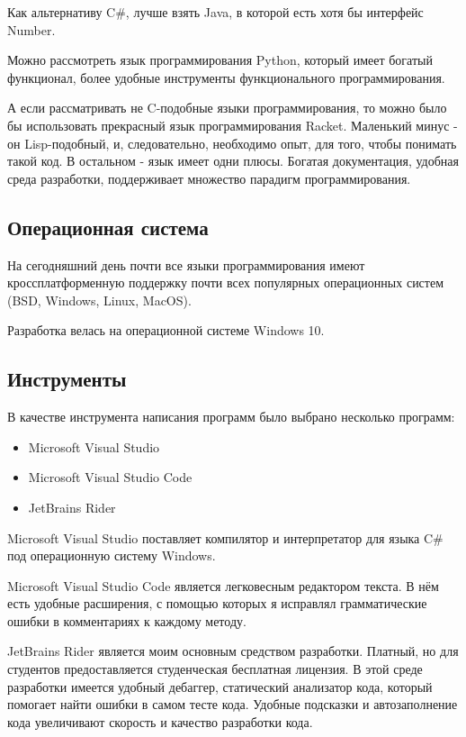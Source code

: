 Как альтернативу C\#, лучше взять Java, в которой есть хотя бы интерфейс Number.

Можно рассмотреть язык программирования Python, который имеет богатый функционал, более удобные инструменты функционального программирования.

А если рассматривать не C-подобные языки программирования, то можно было бы использовать прекрасный язык программирования Racket.
Маленький минус - он Lisp-подобный, и, следовательно, необходимо опыт, для того, чтобы понимать такой код.
В остальном - язык имеет одни плюсы.
Богатая документация, удобная среда разработки, поддерживает множество парадигм программирования.

\subsection{Операционная система}

На сегодняшний день почти все языки программирования имеют кроссплатформенную поддержку почти всех популярных операционных систем (BSD, Windows, Linux, MacOS).

Разработка велась на операционной системе Windows 10.

\subsection{Инструменты}

В качестве инструмента написания программ было выбрано несколько программ:

\begin{itemize}
	\item Microsoft Visual Studio
	\item Microsoft Visual Studio Code
	\item JetBrains Rider
\end{itemize}

Microsoft Visual Studio поставляет компилятор и интерпретатор для языка C\# под операционную систему Windows.

Microsoft Visual Studio Code является легковесным редактором текста.
В нём есть удобные расширения, с помощью которых я исправлял грамматические ошибки в комментариях к каждому методу.

JetBrains Rider является моим основным средством разработки.
Платный, но для студентов предоставляется студенческая бесплатная лицензия.
В этой среде разработки имеется удобный дебаггер, статический анализатор кода, который помогает найти ошибки в самом тесте кода.
Удобные подсказки и автозаполнение кода увеличивают скорость и качество разработки кода.


